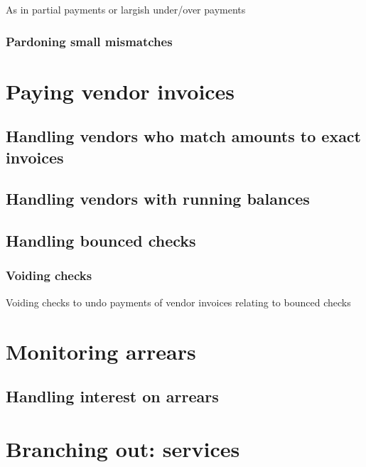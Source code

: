  As in partial payments or largish under/over payments
 
\subsection{Pardoning small mismatches}
\label{subsec-sales-payment-pardoning}



\chapter{Paying vendor invoices}
\label{cha-starting-vendor-payments}

\section{Handling vendors who match amounts to exact invoices}
\label{sec-vendor-invoice-exact-match}

\section{Handling vendors with running balances}
\label{sec-vendor-invoice-running-balance}

\section{Handling bounced checks}
\label{sec-vendor-invoice-bounced-checks}

\subsection{Voiding checks}

Voiding checks to undo payments of vendor invoices relating to bounced checks



\chapter{Monitoring arrears}
\label{cha-starting-monitoring-arrears}

\section{Handling interest on arrears}
\label{sec-monitoring-interest-on-arrears}



\chapter{Branching out: services}
\label{cha-starting-branch-to-services}

